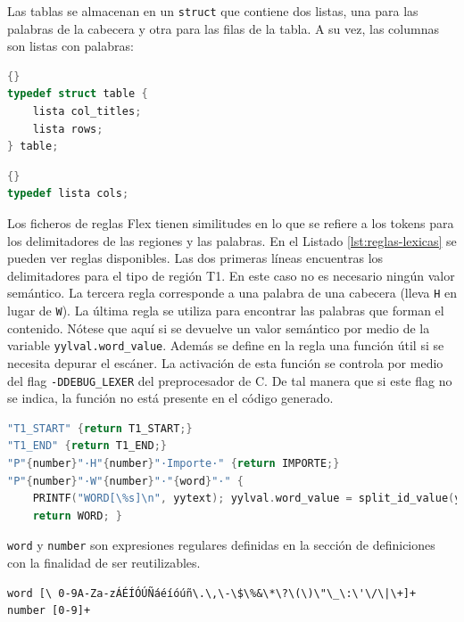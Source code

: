 Las tablas se almacenan en un \verb|struct| que contiene dos listas, una para las palabras de la cabecera y otra para las filas de la tabla. A su vez, las columnas son listas con palabras:

\noindent\begin{minipage}{.45\textwidth}
    \begin{lstlisting}[language=C,caption={},label={}]{}
typedef struct table {
    lista col_titles;
    lista rows;
} table;
    \end{lstlisting}
\end{minipage}\hfill
\begin{minipage}{.45\textwidth}
    \begin{lstlisting}[language=C,caption={},label={}]{}
typedef lista cols;
    \end{lstlisting}
\end{minipage}

Los ficheros de reglas Flex tienen similitudes en lo que se refiere a los tokens para los delimitadores de las regiones y las palabras. En el Listado \ref{lst:reglas-lexicas} se pueden ver reglas disponibles. Las dos primeras líneas encuentras los delimitadores para el tipo de región T1. En este caso no es necesario ningún valor semántico. La tercera regla corresponde a una palabra de una cabecera (lleva \verb|H| en lugar de \verb|W|). La última regla se utiliza para encontrar las palabras que forman el contenido. Nótese que aquí si se devuelve un valor semántico por medio de la variable \verb|yylval.word_value|. Además se define en la regla una función útil si se necesita depurar el escáner. La activación de esta función se controla por medio del flag \verb|-DDEBUG_LEXER| del preprocesador de C. De tal manera que si este flag no se indica, la función no está presente en el código generado.

\begin{lstlisting}[language=C,caption={Reglas léxicas habituales},label={lst:reglas-lexicas}]
"T1_START" {return T1_START;}
"T1_END" {return T1_END;}
"P"{number}"·H"{number}"·Importe·" {return IMPORTE;}
"P"{number}"·W"{number}"·"{word}"·" {
    PRINTF("WORD[\%s]\n", yytext); yylval.word_value = split_id_value(yytext);
    return WORD; }
\end{lstlisting}

\verb|word| y \verb|number| son expresiones regulares definidas en la sección de definiciones con la finalidad de ser reutilizables.

\begin{lstlisting}[caption={Expresiones regulares para palabras y números},label={lst:word-and-number}]
word [\ 0-9A-Za-zÁÉÍÓÚÑáéíóúñ\.\,\-\$\%&\*\?\(\)\"\_\:\'\/\|\+]+
number [0-9]+
\end{lstlisting}

